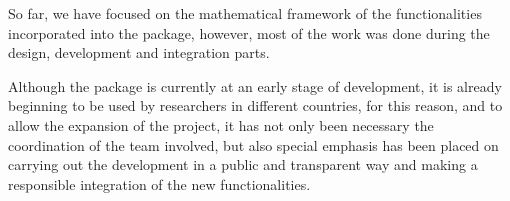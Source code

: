 So far, we have focused on the mathematical framework of the functionalities
incorporated into the package, however, most of the work was done during the
design, development and integration parts.

Although the package is currently at an early stage of development, it is
already beginning to be used by researchers in different countries, for this
reason, and to allow the expansion of the project, it has not only been
necessary the coordination of the team involved, but also special emphasis has
been placed on carrying out the development in a public and transparent way
and making a responsible integration of the new functionalities.
